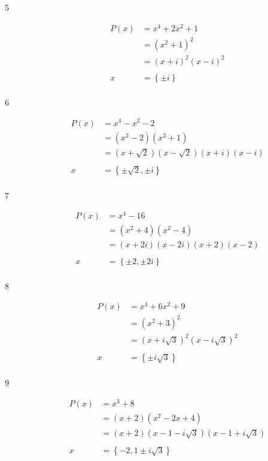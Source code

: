 \documentclass{exam}
\begin{document}
\begin{description}
      \item[5] 
        \begin{align*}
          P(x) &= x^4 + 2x^2 + 1 \\
               &= (x^2 + 1)^2 \\
               &= (x + i)^2(x - i)^2 \\
               \\
          x    &= \boxed{\left\{ \pm i \right\}} \\
        \end{align*}

      \item[6] 
        \begin{align*}
          P(x) &= x^4 - x^2 - 2 \\
               &= \left(x^2-2\right) \left(x^2+1\right) \\
               &= (x + \sqrt{2}) (x - \sqrt{2}) (x + i) (x - i) \\
               \\
          x    &= \boxed{\left\{ \pm \sqrt{2}, \pm i \right\}} \\
        \end{align*}

      \item[7] 
        \begin{align*}
          P(x) &= x^4 - 16 \\
               &= (x^2 + 4)(x^2 - 4) \\
               &= (x + 2i)(x - 2i)(x + 2)(x - 2) \\
               \\
          x    &= \boxed{\left\{ \pm 2, \pm 2i \right\}} \\
        \end{align*}

      \item[8] 
        \begin{align*}
          P(x) &= x^4 + 6x^2 + 9 \\
               &= (x^2 + 3)^2 \\
               &= (x + i \sqrt{3})^2(x - i \sqrt{3})^2 \\
               \\
          x    &= \boxed{\left\{ \pm i \sqrt{3} \right\}} \\
        \end{align*}

      \item[9] 
        \begin{align*}
          P(x) &= x^3 + 8 \\
               &= (x+2) \left(x^2-2 x+4\right) \\
               &= (x + 2)(x - 1 - i \sqrt{3})(x - 1 + i \sqrt{3}) \\
               \\
          x    &= \boxed{\left\{ -2, 1 \pm i \sqrt{3} \right\}} \\
        \end{align*}


\end{description}
\end{document}
